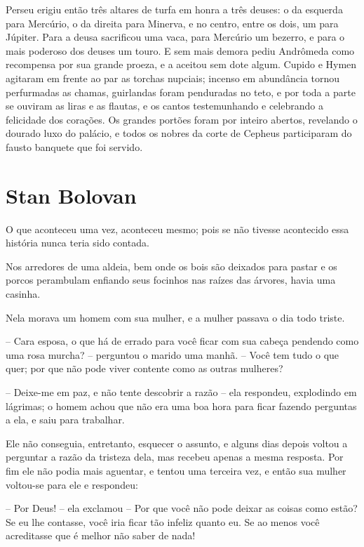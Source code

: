 Perseu erigiu então três altares de turfa em honra a três deuses: o da
esquerda para Mercúrio, o da direita para Minerva, e no centro, entre
os dois, um para Júpiter. Para a deusa sacrificou uma vaca, para
Mercúrio um bezerro, e para o mais poderoso dos deuses um touro. E
sem mais demora pediu Andrômeda como recompensa por sua grande
proeza, e a aceitou sem dote algum. Cupido e Hymen agitaram em frente
ao par as torchas nupciais; incenso em abundância tornou perfurmadas
as chamas, guirlandas foram penduradas no teto, e por toda a parte se
ouviram as liras e as flautas, e os cantos testemunhando e celebrando
a felicidade dos corações. Os grandes portões foram por inteiro
abertos, revelando o dourado luxo do palácio, e todos os nobres da
corte de Cepheus participaram do fausto banquete que foi servido.

\chapter{Stan Bolovan}

O que aconteceu uma vez, aconteceu mesmo; pois se não tivesse
acontecido essa história nunca teria sido contada.

Nos arredores de uma aldeia, bem onde os bois são deixados para pastar
e os porcos perambulam enfiando seus focinhos nas raízes das árvores,
havia uma casinha. 

Nela morava um homem com sua mulher, e a mulher passava o dia todo
triste.

-- Cara esposa, o que há de errado para você ficar com sua cabeça
pendendo como uma rosa murcha? -- perguntou o marido uma manhã. -- Você
tem tudo o que quer; por que não pode viver contente como as outras
mulheres?

-- Deixe-me em paz, e não tente descobrir a razão -- ela respondeu,
explodindo em lágrimas; o homem achou que não era uma boa hora para
ficar fazendo perguntas a ela, e saiu para trabalhar.

Ele não conseguia, entretanto, esquecer o assunto, e alguns dias
depois voltou a perguntar a razão da tristeza dela, mas recebeu
apenas a mesma resposta. Por fim ele não podia mais aguentar, e
tentou uma terceira vez, e então sua mulher voltou-se para ele e
respondeu:

-- Por Deus! -- ela exclamou -- Por que você não pode deixar as coisas
como estão? Se eu lhe contasse, você iria ficar tão infeliz quanto
eu. Se ao menos você acreditasse que é melhor não saber de nada!

